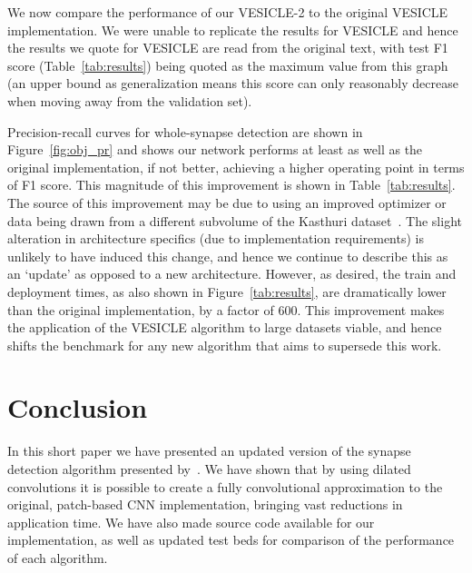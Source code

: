 \documentclass{article}
\begin{document}
We now compare the performance of our VESICLE-2 to the original VESICLE implementation. 
We were unable to replicate the results for VESICLE and hence the results we quote for VESICLE are read from the original text, with test F1 score (Table~\ref{tab:results}) being quoted as the maximum value from this graph (an upper bound as generalization means this score can only reasonably decrease when moving away from the validation set).

Precision-recall curves for whole-synapse detection are shown in Figure~\ref{fig:obj_pr} and shows our network performs at least as well as the original implementation, if not better, achieving a higher operating point in terms of F1 score.
This magnitude of this improvement is shown in Table~\ref{tab:results}. 
The source of this improvement may be due to using an improved optimizer or data being drawn from a different subvolume of the Kasthuri dataset~\cite{kasthuri2015saturated}.
The slight alteration in architecture specifics (due to implementation requirements) is unlikely to have induced this change, and hence we continue to describe this as an `update' as opposed to a new architecture.
However, as  desired, the train and deployment times, as also shown in Figure~\ref{tab:results}, are dramatically lower than the original implementation, by a factor of $600$.
This improvement makes the application of the VESICLE algorithm to large datasets viable, and hence shifts the benchmark for any new algorithm that aims to supersede this work.

\section*{Conclusion}

In this short paper we have presented an updated version of the synapse detection algorithm presented by~\citet{roncal2014vesicle}.
We have shown that by using dilated convolutions it is possible to create a fully convolutional approximation to the original, patch-based CNN implementation, bringing vast reductions in application time.
We have also made source code available for our implementation, as well as updated test beds for comparison of the performance of each algorithm.


\begin{small}

{}
\end{small}
\end{document}
